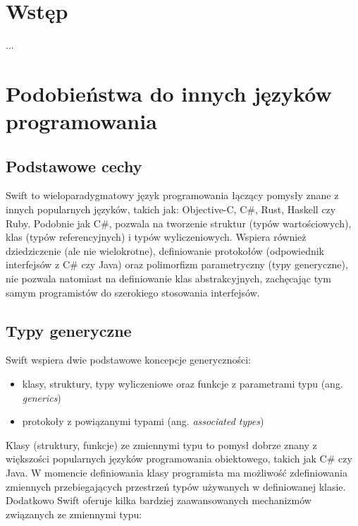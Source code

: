 \documentclass[mgr, shortabstract]{iithesis}
\author         {Maksymilian Debeściak}
\begin{document}

\chapter{Wstęp}
\label{ch:wstep}

...

\chapter{Podobieństwa do innych języków programowania}
\label{ch:podobienstwa_do_innych}

\section{Podstawowe cechy}
\label{s:podstawowe_cechy}

Swift to wieloparadygmatowy język programowania łączący pomysły znane z innych popularnych języków, takich jak: Objective-C, C\#, Rust, Haskell czy Ruby. Podobnie jak C\#, pozwala na tworzenie struktur (typów wartościowych), klas (typów referencyjnych) i typów wyliczeniowych. Wspiera również dziedziczenie (ale nie wielokrotne), definiowanie protokołów (odpowiednik interfejsów z C\# czy Java) oraz polimorfizm parametryczny (typy generyczne), nie pozwala natomiast na definiowanie klas abstrakcyjnych, zachęcając tym samym programistów do szerokiego stosowania interfejsów.

\section{Typy generyczne}
\label{s:typy_generyczne}

Swift wspiera dwie podstawowe koncepcje generyczności:
\begin{itemize}
  \item klasy, struktury, typy wyliczeniowe oraz funkcje z parametrami typu (ang. \textit{generics})
  \item protokoły z powiązanymi typami (ang. \textit{associated types})
\end{itemize}

Klasy (struktury, funkcje) ze zmiennymi typu to pomysł dobrze znany z większości popularnych języków programowania obiektowego, takich jak C\# czy Java. W momencie definiowania klasy programista ma możliwość zdefiniowania zmiennych przebiegających przestrzeń typów używanych w definiowanej klasie. Dodatkowo Swift oferuje kilka bardziej zaawansowanych mechanizmów związanych ze zmiennymi typu:
\end{document}
